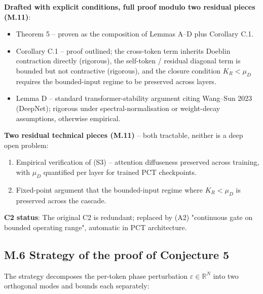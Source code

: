 \documentclass[11pt,a4paper]{article}
\theoremstyle{plain}
\theoremstyle{definition}
\begin{document}
\textbf{Drafted with explicit conditions, full proof modulo two residual pieces (M.11)}:

\begin{itemize}
  \item Theorem 5 -- proven as the composition of Lemmas A--D plus Corollary C.1.
  \item Corollary C.1 -- proof outlined; the cross-token term inherits Doeblin contraction directly (rigorous), the self-token / residual diagonal term is bounded but not contractive (rigorous), and the closure condition $K_R < \mu _D$ requires the bounded-input regime to be preserved across layers.
  \item Lemma D -- standard transformer-stability argument citing Wang--Sun 2023 (DeepNet); rigorous under spectral-normalisation or weight-decay assumptions, otherwise empirical.
\end{itemize}

\textbf{Two residual technical pieces (M.11)} -- both tractable, neither is a deep open problem:

\begin{enumerate}
  \item Empirical verification of (S3) -- attention diffuseness preserved across training, with $\mu _D$ quantified per layer for trained PCT checkpoints.
  \item Fixed-point argument that the bounded-input regime where $K_R < \mu _D$ is preserved across the cascade.
\end{enumerate}

\textbf{C2 status}: The original C2 is redundant; replaced by (A2) "continuous gate on bounded operating range", automatic in PCT architecture.

\subsection{M.6 Strategy of the proof of Conjecture 5}
The strategy decomposes the per-token phase perturbation $\varepsilon  \in  \mathbb{R}^N$ into two orthogonal modes and bounds each separately:
\end{document}
